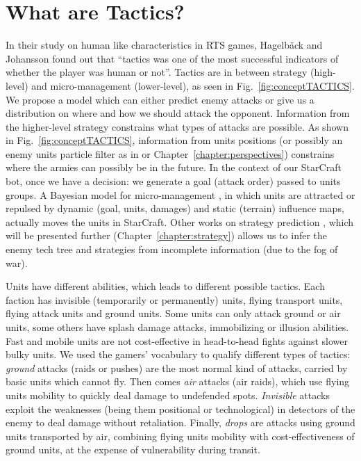 \section{What are Tactics?}
In their study on human like characteristics in RTS games, Hagelb\"{a}ck and Johansson \cite{HagelbackCIG10} found out that ``tactics was one of the most successful indicators of whether the player was human or not''. Tactics are in between strategy (high-level) and micro-management (lower-level), as seen in Fig.~\ref{fig:conceptTACTICS}. We propose a model which can either predict enemy attacks or give us a distribution on where and how we should attack the opponent. Information from the higher-level strategy constrains what types of attacks are possible. As shown in Fig.~\ref{fig:conceptTACTICS}, information from units positions (or possibly an enemy units particle filter as in \cite{weber2011aiide} or Chapter~\ref{chapter:perspectives}) constrains where the armies can possibly be in the future. In the context of our StarCraft bot, once we have a decision: we generate a goal (attack order) passed to units groups. %
A Bayesian model for micro-management \cite{SYNNAEVE:Micro}, in which units are attracted or repulsed by dynamic (goal, units, damages) and static (terrain) influence maps, actually moves the units in StarCraft. Other works on strategy prediction \cite{SYNNAEVE:StratPred,SYNNAEVE:OpeningPred}, which will be presented further (Chapter~\ref{chapter:strategy}) allows us to infer the enemy tech tree and strategies from incomplete information (due to the fog of war).


Units have different abilities, which leads to different possible tactics. Each faction has invisible (temporarily or permanently) units, flying transport units, flying attack units and ground units. Some units can only attack ground or air units, some others have splash damage attacks, immobilizing or illusion abilities. Fast and mobile units are not cost-effective in head-to-head fights against slower bulky units. We used the gamers' vocabulary to qualify different types of tactics: \textit{ground} attacks (raids or pushes) are the most normal kind of attacks, carried by basic units which cannot fly. Then comes \textit{air} attacks (air raids), which use flying units mobility to quickly deal damage to undefended spots. \textit{Invisible} attacks exploit the weaknesses (being them positional or technological) in detectors of the enemy to deal damage without retaliation. Finally, \textit{drops} are attacks using ground units transported by air, combining flying units mobility with cost-effectiveness of ground units, at the expense of vulnerability during transit.


